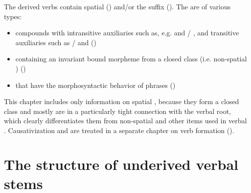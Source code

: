 The derived verbs contain spatial  () and\slash or the  suffix (). The  are of various types:
%
\begin{itemize}
	\item	{} compounds with intransitive auxiliaries such as, e.g.   and \slash{} , and transitive auxiliaries such as \slash{}  and   ()
	\item	{} containing an invariant bound morpheme from a closed class (i.e. non-spatial ) ()
	\item	{} that have the morphosyntactic behavior of phrases ()
\end{itemize}

This chapter includes only information on spatial  , because they form a closed class and mostly are in a particularly tight connection with the verbal root, which clearly differentiates them from non-spatial  and other items used in verbal . Causativization and  are treated in a separate chapter on verb formation ().


\section{The structure of underived verbal stems}
\label{sec:The structure underived verbal stems}

